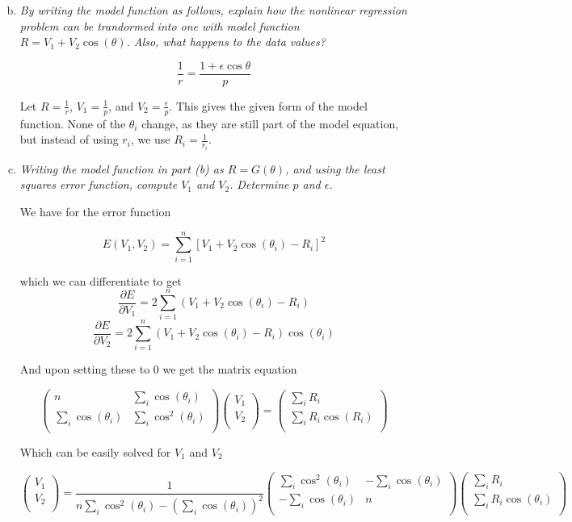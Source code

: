 \documentclass{article}
\begin{document}
\begin{enumerate}[(a)]\setcounter{enumi}{1}
  \item \textit{By writing the model function as follows, explain how the nonlinear regression problem can be trandormed into one with model function $R = V_1 + V_2\cos(\theta)$. Also, what happens to the data values?}

    $$\frac{1}{r} = \frac{1 + \epsilon\cos\theta}{p}$$

    Let $R = \frac{1}{r}$, $V_1 = \frac{1}{p}$, and $V_2 = \frac{\epsilon}{p}$. This gives the given form of the model function. None of the $\theta_i$ change, as they are still part of the model equation, but instead of using $r_i$, we use $R_i = \frac{1}{r_i}$.
  \item \textit{Writing the model function in part (b) as $R = G(\theta)$, and using the least squares error function, compute $V_1$ and $V_2$. Determine $p$ and $\epsilon$.}

    We have for the error function

    $$E(V_1,V_2) = \sum_{i=1}^n [V_1 + V_2\cos(\theta_i) - R_i]^2$$

    which we can differentiate to get
    $$\frac{\partial E}{\partial V_1} = 2\sum_{i=1}^n (V_1 + V_2\cos(\theta_i) - R_i)$$
    $$\frac{\partial E}{\partial V_2} = 2\sum_{i=1}^n (V_1 + V_2\cos(\theta_i) - R_i)\cos(\theta_i)$$

    And upon setting these to 0 we get the matrix equation
    
    \[
      \begin{pmatrix}
        n & \sum_i \cos(\theta_i) \\ \sum_i \cos(\theta_i) & \sum_i \cos^2(\theta_i) \\
      \end{pmatrix}
      \begin{pmatrix}
        V_1 \\ V_2 \\
      \end{pmatrix}
      =
      \begin{pmatrix}
        \sum_{i} R_i \\ \sum_i R_i\cos(R_i) \\
      \end{pmatrix}
    \]

    Which can be easily solved for $V_1$ and $V_2$
    
    \[
      \begin{pmatrix}
        V_1 \\ V_2 \\
      \end{pmatrix}
      =
      \frac{1}{n\sum_i \cos^2(\theta_i) - (\sum_i\cos(\theta_i))^2}
      \begin{pmatrix}
        \sum_i\cos^2(\theta_i) & -\sum_i\cos(\theta_i) \\ -\sum_i\cos(\theta_i) & n \\
      \end{pmatrix}
      \begin{pmatrix}
        \sum_i R_i \\ \sum_i R_i\cos(\theta_i) \\
      \end{pmatrix}
    \]


\end{enumerate}
\end{document}
